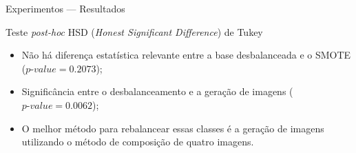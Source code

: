 \documentclass[10pt]{beamer}
\begin{document}
\begin{frame}{Experimentos --- Resultados}
  \setlength\leftmargini{1em}
  \begin{block}{Teste \textit{post-hoc} HSD (\textit{Honest Significant Difference}) de Tukey}
  \begin{itemize}
    \item Não há diferença estatística relevante entre a base desbalanceada e o SMOTE ($\textit{p-value}=0.2073$);
    \item Significância entre o desbalanceamento e a geração de imagens ($\textit{p-value}=0.0062$);
    \item O melhor método para rebalancear essas classes é a geração de imagens utilizando o método de composição de quatro imagens.
  \end{itemize}
  \end{block}
\end{frame}
\end{document}
